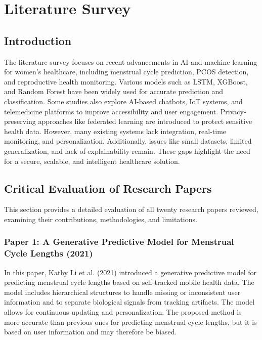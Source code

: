 \chapter{Literature Survey}
\doublespacing

\section{Introduction}

The literature survey focuses on recent advancements in AI and machine learning for women's healthcare, including menstrual cycle prediction, PCOS detection, and reproductive health monitoring. Various models such as LSTM, XGBoost, and Random Forest have been widely used for accurate prediction and classification. Some studies also explore AI-based chatbots, IoT systems, and telemedicine platforms to improve accessibility and user engagement. Privacy-preserving approaches like federated learning are introduced to protect sensitive health data. However, many existing systems lack integration, real-time monitoring, and personalization. Additionally, issues like small datasets, limited generalization, and lack of explainability remain. These gaps highlight the need for a secure, scalable, and intelligent healthcare solution.

\section{Critical Evaluation of Research Papers}

This section provides a detailed evaluation of all twenty research papers reviewed, examining their contributions, methodologies, and limitations.

\subsection{Paper 1: A Generative Predictive Model for Menstrual Cycle Lengths (2021)}
In this paper, Kathy Li et al. (2021) introduced a generative predictive model for predicting menstrual cycle lengths based on self-tracked mobile health data. The model includes hierarchical structures to handle missing or inconsistent user information and to separate biological signals from tracking artifacts. The model allows for continuous updating and personalization. The proposed method is more accurate than previous ones for predicting menstrual cycle lengths, but it is based on user information and may therefore be biased. \cite{li2021,urteaga2017,li2020}\cite{urteaga2017}\cite{li2020}

